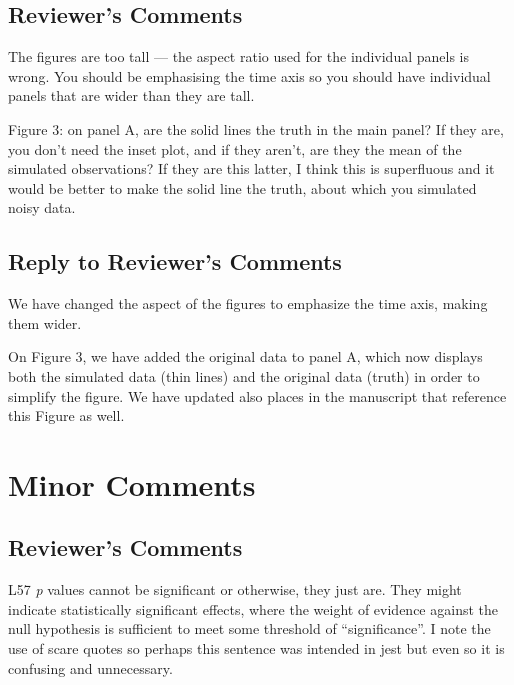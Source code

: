 \documentclass[
]{article}
\begin{document}
\hypertarget{reviewers-comments-16}{%
\subsection{Reviewer's Comments}\label{reviewers-comments-16}}

The figures are too tall --- the aspect ratio used for the individual panels is wrong. You should be emphasising the time axis so you should have individual panels that are wider than they are tall.

Figure 3: on panel A, are the solid lines the truth in the main panel? If they are, you don't need the inset plot, and if they aren't, are they the mean of the simulated observations? If they are this latter, I think this is superfluous and it would be better to make the solid line the truth, about which you simulated noisy data.

\hypertarget{section-17}{%
\subsection{\texorpdfstring{\textcolor{reviewersblue} {Reply to Reviewer's Comments}}{}}\label{section-17}}

We have changed the aspect of the figures to emphasize the time axis, making them wider.

On Figure 3, we have added the original data to panel A, which now displays both the simulated data (thin lines) and the original data (truth) in order to simplify the figure. We have updated also places in the manuscript that reference this Figure as well.

\hypertarget{minor-comments}{%
\section{Minor Comments}\label{minor-comments}}

\hypertarget{reviewers-comments-17}{%
\subsection{Reviewer's Comments}\label{reviewers-comments-17}}

L57 \emph{p} values cannot be significant or otherwise, they just are. They might indicate statistically significant effects, where the weight of evidence against the null hypothesis is sufficient to meet some threshold of ``significance''. I note the use of scare quotes so perhaps this sentence was intended in jest but even
so it is confusing and unnecessary.
\end{document}
